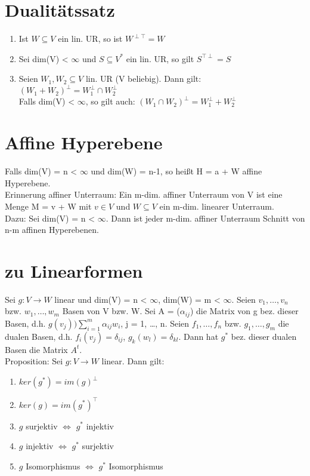 \section{Dualitätssatz}
\begin{enumerate}
\item Ist $W \subseteq V$ ein lin. UR, so ist $W^{\perp \top} = W$
\item Sei dim(V) < $\infty$ und $S \subseteq V^*$ ein lin. UR, so gilt  $S^{\top \perp} = S$
\item Seien $W_1, W_2 \subseteq V$ lin. UR (V beliebig). Dann gilt:\\
$(W_1 + W_2)^\perp = W_1^\perp \cap W_2^\perp$\\
Falls dim(V) < $\infty$, so gilt auch: $(W_1 \cap W_2)^\perp = W_1^\perp + W_2^\perp$
\end{enumerate}

\section{Affine Hyperebene}
Falls dim(V) = n < $\infty$ und dim(W) = n-1, so heißt H = a + W affine Hyperebene.\\
Erinnerung affiner Unterraum: Ein m-dim. affiner Unterraum von V ist eine Menge M = v + W mit  $v \in V$ und $W \subseteq V$ ein m-dim. linearer Unterraum.\\
Dazu: Sei dim(V) = n < $\infty$. Dann ist jeder m-dim. affiner Unterraum Schnitt von n-m affinen Hyperebenen.

\section{zu Linearformen}
Sei $g: V \to W$ linear und dim(V) = n < $\infty$, dim(W) = m < $\infty$. Seien $v_1, …, v_n$ bzw. $w_1, …, w_m$ Basen von V bzw. W. Sei A = ($\alpha_{ij}$) die Matrix von g bez. dieser Basen, d.h. $g(v_j) ) \sum\limits_{i=1}^m \alpha_{ij} w_i$, j = 1, …, n. Seien $f_1, …, f_n$ bzw. $g_1, …, g_m$ die dualen Basen, d.h. $f_i(v_j) = \delta_{ij}$, $g_k(w_l) = \delta_{kl}$. Dann hat $g^*$ bez. dieser dualen Basen die Matrix $A^t$.\\
Proposition: Sei $g: V \to W$ linear. Dann gilt:
\begin{enumerate}
\item $ker(g^*) = im(g)^\perp$
\item $ker(g) = im(g^*)^\top$
\item $g$ surjektiv $\Leftrightarrow$ $g^*$ injektiv
\item $g$ injektiv $\Leftrightarrow$ $g^*$ surjektiv
\item $g$ Isomorphismus $\Leftrightarrow$ $g^*$ Isomorphismus
\end{enumerate}

